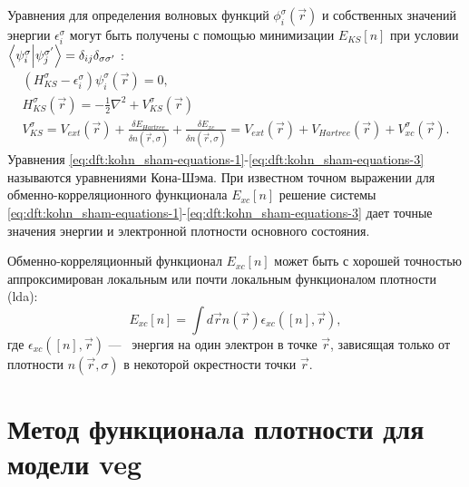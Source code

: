 Уравнения для определения волновых функций $\phi_i^\sigma (\vec{r})$ и собственных значений энергии $\epsilon_i^\sigma$ могут быть получены с помощью минимизации $E_{KS} [n]$ при условии $\bra{\psi_i^\sigma} \ket{\psi_j^{\sigma'}} = \delta_{ij} \delta_{\sigma \sigma'}$ \cite{kohn-sham:dft-kinetic-approximation}:
\begin{gather}
    \label{eq:dft:kohn_sham-equations-1}
    (H_{KS}^\sigma - \epsilon_i^\sigma) \psi_i^\sigma (\vec{r}) = 0, \\
    \label{eq:dft:kohn_sham-equations-2}
    H_{KS}^\sigma (\vec{r}) = - \frac{1}{2} \nabla^2 + V_{KS}^\sigma (\vec{r}) \\
    \label{eq:dft:kohn_sham-equations-3}
    V_{KS}^\sigma = V_{ext} (\vec{r}) + \frac{\delta E_{Hartree}}{\delta n(\vec{r}, \sigma)} + \frac{\delta E_{xc}}{\delta n(\vec{r}, \sigma)}
    = V_{ext} (\vec{r}) + V_{Hartree} (\vec{r}) + V_{xc}^\sigma (\vec{r}).
\end{gather}
Уравнения \eqref{eq:dft:kohn_sham-equations-1}-\eqref{eq:dft:kohn_sham-equations-3} называются уравнениями Кона-Шэма.
При известном точном выражении для обменно-корреляционного функционала $E_{xc} [n]$
решение системы \eqref{eq:dft:kohn_sham-equations-1}-\eqref{eq:dft:kohn_sham-equations-3} дает точные значения энергии и электронной плотности основного состояния.

Обменно-корреляционный функционал $E_{xc} [n]$ может быть с хорошей точностью аппроксимирован локальным или почти локальным функционалом плотности (\acrshort{lda}):
\begin{equation}
    \label{eq:dft:E_xc-LDA}
    E_{xc} [n] = \int d\vec{r} n(\vec{r}) \epsilon_{xc} ([n], \vec{r}),
\end{equation}
где $\epsilon_{xc} ([n], \vec{r})$ ---~ энергия на один электрон в точке $\vec{r}$, зависящая только от плотности $n(\vec{r}, \sigma)$ в некоторой окрестности точки $\vec{r}$.


\section{Метод функционала плотности для модели \texorpdfstring{\acrshort{veg}}{ВЭГ}}

